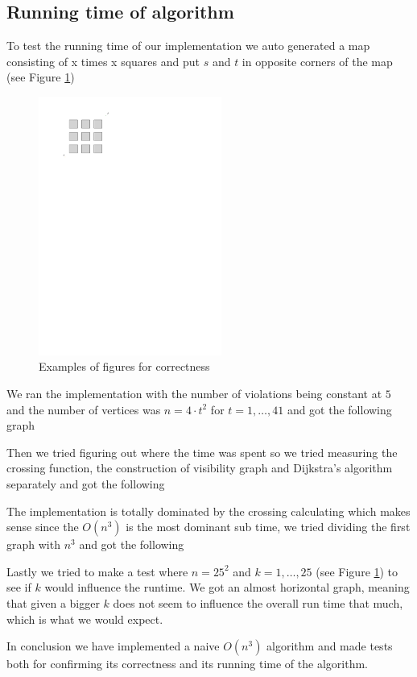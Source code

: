 \subsection{Running time of algorithm}
To test the running time of our implementation we auto generated a map consisting of
x times x squares and put $s$ and $t$ in opposite corners of the map (see Figure
\ref{fig:test})

\begin{figure}[H]
    \centering
	\includegraphics[width=6cm]{figures/testexample.pdf}
	\caption{Examples of figures for correctness}
	\label{fig:test}
\end{figure}
\label{testfilegeneration}
We ran the implementation with the number of violations being constant at $5$ and the
number of vertices was $n= 4 \cdot t^2$ for $t=1,\dots,41$ and got the following graph

\begin{center}

\end{center}

Then we tried figuring out where the time was spent so we tried measuring the
crossing function, the construction of visibility graph and Dijkstra's
algorithm separately and got the following

\begin{center}

\end{center}

The implementation is totally dominated by the crossing calculating which makes
sense since the $O(n^3)$ is the most dominant sub time, we tried dividing the first graph
with $n^3$ and got the following

\begin{center}

\end{center}

Lastly we tried to make a test where $n=25^2$ and $k=1,\dots,25$ (see Figure
\ref{fig:test}) to see if $k$ would influence the runtime. We got an almost
horizontal graph, meaning that given a bigger $k$ does not seem to influence the
overall run time that much, which is what we would expect.

\begin{center}

\end{center}

In conclusion we have implemented a naive $O(n^3)$ algorithm and made tests both
for confirming its correctness and its running time of the algorithm.
